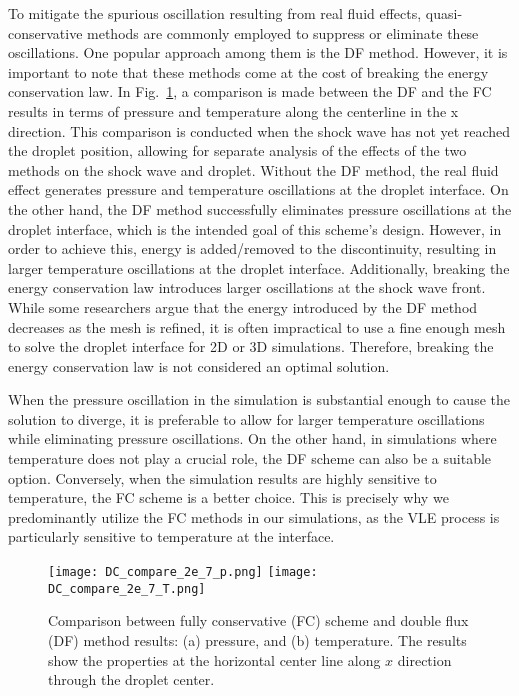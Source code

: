 To mitigate the spurious oscillation resulting from real fluid effects, quasi-conservative methods are commonly employed to suppress or eliminate these oscillations. One popular approach among them is the DF method. However, it is important to note that these methods come at the cost of breaking the energy conservation law. In Fig.~\ref{droplet_DC_compare}, a comparison is made between the DF and the FC results in terms of pressure and temperature along the centerline in the x direction. This comparison is conducted when the shock wave has not yet reached the droplet position, allowing for separate analysis of the effects of the two methods on the shock wave and droplet. Without the DF method, the real fluid effect generates pressure and temperature oscillations at the droplet interface. On the other hand, the DF method successfully eliminates pressure oscillations at the droplet interface, which is the intended goal of this scheme's design. However, in order to achieve this, energy is added/removed to the discontinuity, resulting in larger temperature oscillations at the droplet interface. Additionally, breaking the energy conservation law introduces larger oscillations at the shock wave front. While some researchers argue that the energy introduced by the DF method decreases as the mesh is refined, it is often impractical to use a fine enough mesh to solve the droplet interface for 2D or 3D simulations. Therefore, breaking the energy conservation law is not considered an optimal solution. 

When the pressure oscillation in the simulation is substantial enough to cause the solution to diverge, it is preferable to allow for larger temperature oscillations while eliminating pressure oscillations. On the other hand, in simulations where temperature does not play a crucial role, the DF scheme can also be a suitable option. Conversely, when the simulation results are highly sensitive to temperature, the FC scheme is a better choice. This is precisely why we predominantly utilize the FC methods in our simulations, as the VLE process is particularly sensitive to temperature at the interface.



\begin{figure}[htbp]
\centering
\texttt{[image: DC\_compare\_2e\_7\_p.png]}
\texttt{[image: DC\_compare\_2e\_7\_T.png]}
\caption{Comparison between fully conservative (FC) scheme and double flux (DF) method results: (a) pressure, and (b) temperature. The results show the properties at the horizontal center line along $x$ direction through the droplet center.}
\label{droplet_DC_compare} 
\end{figure}

